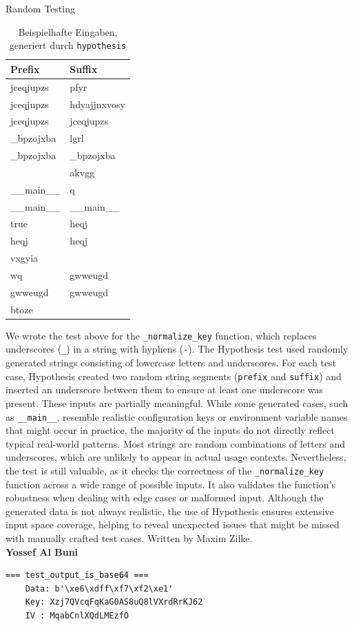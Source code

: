 \documentclass[a4paper]{scrreprt}
\newcounter{question}
\begin{document}
\begin{question}{Random Testing}
\begin{enumerate}[topsep=0pt, leftmargin=*]
\begin{answer}
\begin{table}[ht]
\centering
\begin{tabular}{|l|l|}
\hline
\textbf{Prefix} & \textbf{Suffix} \\
\hline
jceqjupzs & pfyr \\
jceqjupzs & hdyajjnxvosy \\
jceqjupzs & jceqjupzs \\
\_bpzojxba & lgrl \\
\_bpzojxba & \_bpzojxba \\
 & akvgg \\
\_\_main\_\_ & q \\
\_\_main\_\_ & \_\_main\_\_ \\
true & heqj \\
heqj & heqj \\
vxgyia &  \\
wq & gwweugd \\
gwweugd & gwweugd \\
btoze &  \\
\hline
\end{tabular}
\caption{Beispielhafte Eingaben, generiert durch \texttt{hypothesis}}
\label{tab:hypothesis-inputs}
\end{table}
We wrote the test above for the \texttt{\_normalize\_key} function,  which replaces underscores (\texttt{\_}) in a string with hyphens (\texttt{-}). The Hypothesis test used randomly generated strings consisting of lowercase letters and underscores. For each test case, Hypothesis created two random string segments (\texttt{prefix} and \texttt{suffix}) and inserted an underscore between them to ensure at least one underscore was present. These inputs are partially meaningful. While some generated cases, such as \texttt{\_\_main\_\_}, resemble realistic configuration keys or environment variable names that might occur in practice, the majority of the inputs do not directly reflect typical real-world patterns. Most strings are random combinations of letters and underscores, which are unlikely to appear in actual usage contexts. Nevertheless, the test is still valuable, as it checks the correctness of the \texttt{\_normalize\_key} function across a wide range of possible inputs. It also validates the function's robustness when dealing with edge cases or malformed input. Although the generated data is not always realistic, the use of Hypothesis ensures extensive input space coverage, helping to reveal unexpected issues that might be missed with manually crafted test cases. Written by Maxim Zilke. \\
\textbf{Yossef Al Buni} \\
    \begin{lstlisting}[caption={Yossef Al Buni -- Inputs for the Hypothesis-Tests in test\_encrypt\_data\_4}, label={lst:encryption}]
    === test_output_is_base64 ===
    Data: b'\xe6\xdff\xf7\xf2\xe1'
    Key: Xzj7QVcqFqKaG0AS8uQ8lVXrdRrKJ62
    IV : MqabCnlXQdLMEzfO
    

\end{lstlisting}
\end{answer}
\end{enumerate}
\end{question}
\end{document}
